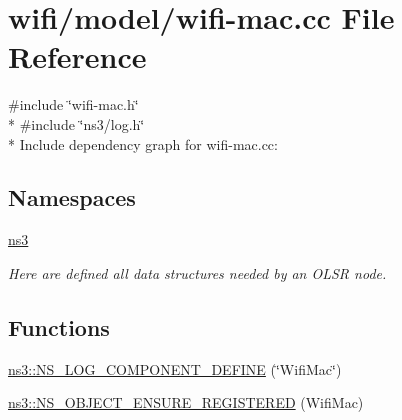 \hypertarget{wifi-mac_8cc}{}\section{wifi/model/wifi-\/mac.cc File Reference}
\label{wifi-mac_8cc}
{\ttfamily \#include \char`\"{}wifi-\/mac.\+h\char`\"{}}\\*
{\ttfamily \#include \char`\"{}ns3/log.\+h\char`\"{}}\\*
Include dependency graph for wifi-\/mac.cc\+:
\subsection*{Namespaces}
\begin{DoxyCompactItemize}
\item 
 \hyperlink{namespacens3}{ns3}
\begin{DoxyCompactList}\small\item\em Here are defined all data structures needed by an O\+L\+SR node. \end{DoxyCompactList}\end{DoxyCompactItemize}
\subsection*{Functions}
\begin{DoxyCompactItemize}
\item 
\hyperlink{namespacens3_ae38ee74dc67c546adc396c54389a6cca}{ns3\+::\+N\+S\+\_\+\+L\+O\+G\+\_\+\+C\+O\+M\+P\+O\+N\+E\+N\+T\+\_\+\+D\+E\+F\+I\+NE} (\char`\"{}Wifi\+Mac\char`\"{})
\item 
\hyperlink{namespacens3_ac612315de81d7f06859e14912d1f52db}{ns3\+::\+N\+S\+\_\+\+O\+B\+J\+E\+C\+T\+\_\+\+E\+N\+S\+U\+R\+E\+\_\+\+R\+E\+G\+I\+S\+T\+E\+R\+ED} (Wifi\+Mac)
\end{DoxyCompactItemize}
